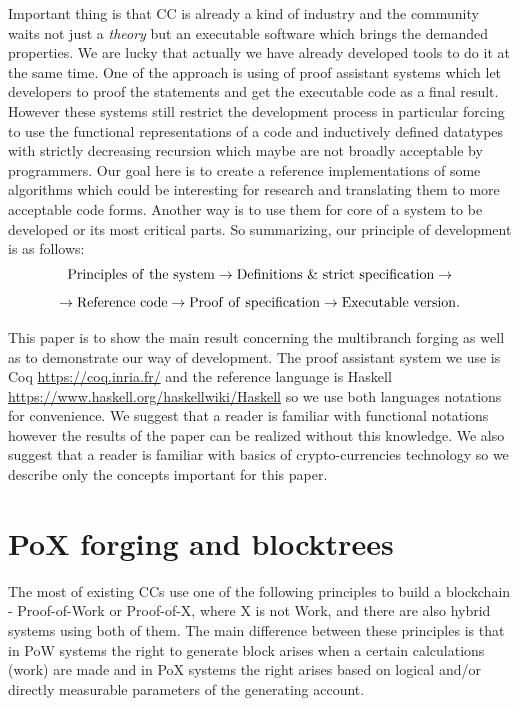 \documentclass[12pt]{article}
\begin{document}
Important thing is that CC is already a kind of industry and the community waits not just a {\it theory}
but an executable software which brings the demanded properties. We are lucky that actually we have already developed tools to do it at the same time. One
of the approach is using of proof assistant systems which let developers to proof the statements and get the executable code as a final result. However
these systems still restrict the development process in particular forcing to use the functional representations of a code and inductively defined datatypes with
strictly decreasing recursion which maybe are not broadly acceptable by programmers. Our goal here is to create a reference implementations of some algorithms
which could be interesting for research and translating them to more acceptable code forms. Another way is to use them for core of a system to be developed or
its most critical parts. So summarizing, our principle of development is as follows:
$$
{\rm Principles\ of\ the\ system}\to{\rm Definitions\ \&\ strict\ specification}\to
$$
$$
\to{\rm Reference\ code}\to{\rm Proof\ of\ specification}\to{\rm Executable\ version}.
$$  

This paper is to show the main result concerning the multibranch forging as well as to demonstrate our way of development. The proof assistant system we use is 
Coq \url{https://coq.inria.fr/} and the reference language is Haskell \url{https://www.haskell.org/haskellwiki/Haskell} so we use both languages notations for convenience. We suggest that a reader is familiar with functional 
notations however the results of the paper can be realized without this knowledge. We also suggest that a reader is familiar with basics of crypto-currencies
technology so we describe only the concepts important for this paper.

\section{PoX forging and blocktrees}
The most of existing CCs use one of the following principles to build a blockchain \-- Proof-of-Work or Proof-of-X, where X is not Work, 
and there are also hybrid 
systems using both of them. The main difference between these principles is that in PoW systems the right to generate block arises 
when a certain calculations (work) are made and in PoX systems the right arises based on logical and/or directly measurable parameters of the generating account. 
\end{document}
